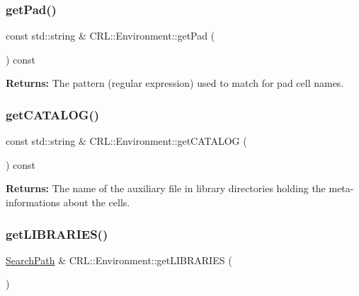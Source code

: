 \subsubsection{\texorpdfstring{get\+Pad()}{getPad()}}
{\footnotesize\ttfamily const std\+::string \& C\+R\+L\+::\+Environment\+::get\+Pad (\begin{DoxyParamCaption}{ }\end{DoxyParamCaption}) const\hspace{0.3cm}{\ttfamily [inline]}}

{\bfseries Returns\+:} The pattern (regular expression) used to match for pad cell names. \mbox{\label{classCRL_1_1Environment_a3bb5c9e02c1391142e439f023bdc0355}} 
\subsubsection{\texorpdfstring{get\+C\+A\+T\+A\+L\+O\+G()}{getCATALOG()}}
{\footnotesize\ttfamily const std\+::string \& C\+R\+L\+::\+Environment\+::get\+C\+A\+T\+A\+L\+OG (\begin{DoxyParamCaption}{ }\end{DoxyParamCaption}) const\hspace{0.3cm}{\ttfamily [inline]}}

{\bfseries Returns\+:} The name of the auxiliary file in library directories holding the meta-\/informations about the cells. \mbox{\label{classCRL_1_1Environment_acf7a3bc42cfb4b98f1da859ed27ca97e}} 
\subsubsection{\texorpdfstring{get\+L\+I\+B\+R\+A\+R\+I\+E\+S()}{getLIBRARIES()}}
{\footnotesize\ttfamily \mbox{\hyperlink{classCRL_1_1SearchPath}{Search\+Path}} \& C\+R\+L\+::\+Environment\+::get\+L\+I\+B\+R\+A\+R\+I\+ES (\begin{DoxyParamCaption}{ }\end{DoxyParamCaption})\hspace{0.3cm}{\ttfamily [inline]}}

